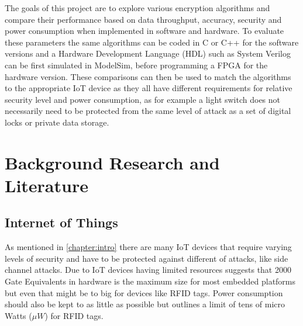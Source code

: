\documentclass[12pt,twoside,a4paper]{report}
\begin{document}
    The goals of this project are to explore various encryption algorithms and compare their performance based on data throughput, accuracy, security and power consumption when implemented in software and hardware.
    To evaluate these parameters the same algorithms can be coded in C or C++ for the software versions and a Hardware Development Language (HDL) such as System Verilog can be first simulated in ModelSim, before programming a FPGA for the hardware version.
    These comparisons can then be used to match the algorithms to the appropriate IoT device as they all have different requirements for relative security level and power consumption, as for example a light switch does not necessarily need to be protected from the same level of attack as a set of digital locks or private data storage.
    
    
    \chapter{Background Research and Literature}
    \label{chapter:research}
    
    \section{Internet of Things}
    \label{section:IoT}
    As mentioned in \autoref{chapter:intro} there are many IoT devices that require varying levels of security and have to be protected against different of attacks, like side channel attacks.
    Due to IoT devices having limited resources \cite{Juels2005} suggests that 2000 Gate Equivalents in hardware is the maximum size for most embedded platforms but even that might be to big for devices like RFID tags. Power consumption should also be kept to as little as possible but \cite{David2011} outlines a limit of tens of micro Watts ($\mu W$) for RFID tags.
    
\end{document}

